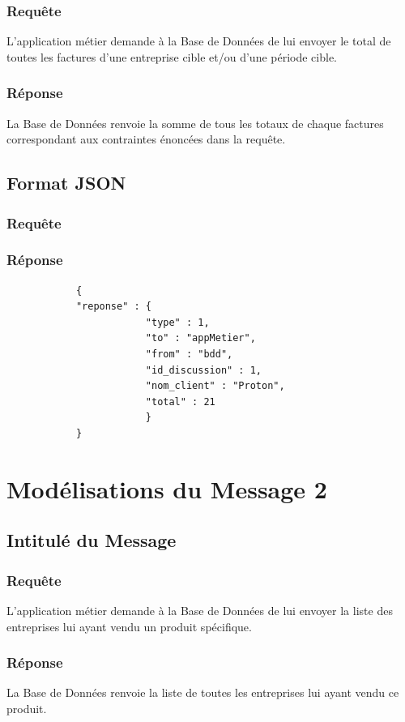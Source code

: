 \documentclass[a4paper, 11pt]{article}
\begin{document}
        \subsubsection{Requête} 
        L'application métier demande à la Base de Données de lui envoyer le total de toutes les factures d'une entreprise cible et/ou d'une période cible.
        \subsubsection{Réponse}
        La Base de Données renvoie la somme de tous les totaux de chaque factures correspondant aux contraintes énoncées dans la requête.
    \subsection{Format JSON}
        \subsubsection{Requête}
        
        \subsubsection{Réponse}
        \begin{verbatim}
            {
            "reponse" : {
                        "type" : 1,
                        "to" : "appMetier",
                        "from" : "bdd",
                        "id_discussion" : 1,
                        "nom_client" : "Proton",
                        "total" : 21
                        }
            }
        \end{verbatim}
\section{Modélisations du Message 2}
    \subsection{Intitulé du Message}
        \subsubsection{Requête} 
        L'application métier demande à la Base de Données de lui envoyer la liste des entreprises lui ayant vendu un produit spécifique.
        \subsubsection{Réponse}
        La Base de Données renvoie la liste de toutes les entreprises lui ayant vendu ce produit.
\end{document}
